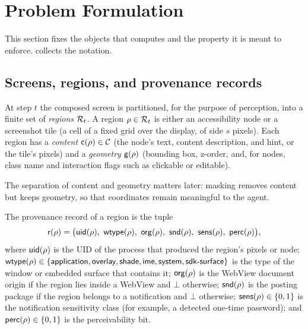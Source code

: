 \section{Problem Formulation}\label{sec:formulation}

This section fixes the objects that \PG{} computes and the property it is meant to enforce.  collects the notation.

\subsection{Screens, regions, and provenance records}

\begin{definition}[Region]\label{def:region}
At step $t$ the composed screen is partitioned, for the purpose of perception, into a finite set of \emph{regions} $\mathcal{R}_t$. A region $\rho\in\mathcal{R}_t$ is either an accessibility node or a screenshot tile (a cell of a fixed grid over the display, of side $s$ pixels). Each region has a \emph{content} $\mathsf{c}(\rho)\in\mathcal{C}$ (the node's text, content description, and hint, or the tile's pixels) and a \emph{geometry} $\mathsf{g}(\rho)$ (bounding box, z-order, and, for nodes, class name and interaction flags such as clickable or editable).
\end{definition}

The separation of content and geometry matters later: masking removes content but keeps geometry, so that coordinates remain meaningful to the agent.

\begin{definition}\label{def:record}
The provenance record of a region is the tuple
\begin{equation}\label{eq:record}
  \rec(\rho) = \bigl(\uid(\rho),\ \wtype(\rho),\ \org(\rho),\ \snd(\rho),\ \sens(\rho),\ \perc(\rho)\bigr),
\end{equation}
where $\mathsf{uid}(\rho)$ is the UID of the process that produced the region's pixels or node; $\mathsf{wtype}(\rho)\in\{\textsf{application},\textsf{overlay},\textsf{shade},\textsf{ime},\textsf{system},\textsf{sdk-surface}\}$ is the type of the window or embedded surface that contains it; $\mathsf{org}(\rho)$ is the WebView document origin if the region lies inside a WebView and $\bot$ otherwise; $\mathsf{snd}(\rho)$ is the posting package if the region belongs to a notification and $\bot$ otherwise; $\mathsf{sens}(\rho)\in\{0,1\}$ is the notification sensitivity class (for example, a detected one-time password); and $\mathsf{perc}(\rho)\in\{0,1\}$ is the perceivability bit.
\end{definition}

